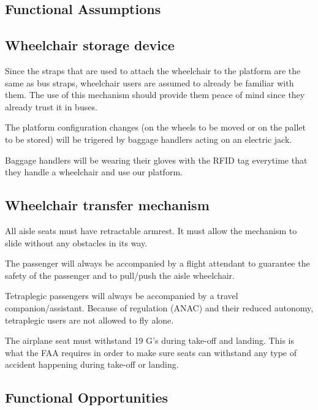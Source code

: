\subsection{Functional Assumptions}

\subsection*{Wheelchair storage device}

\begin{list}{-}{}
  \item Since the straps that are used to attach the wheelchair to the platform are the same as bus straps, wheelchair users are assumed to already be familiar with them. The use of this mechanism should provide them peace of mind since they already trust it in buses.
  \item The platform configuration changes (on the wheels to be moved or on the pallet to be stored) will be trigered by baggage handlers acting on an electric jack.
  \item Baggage handlers will be wearing their gloves with the RFID tag everytime that they handle a wheelchair and use our platform.
\end{list}

\subsection*{Wheelchair transfer mechanism}

\begin{list}{-}{}
  \item All aisle seats must have retractable armrest. It must allow the mechanism to slide without any obstacles in its way.
  \item The passenger will always be accompanied by a flight attendant to guarantee the safety of the passenger and to pull/push the aisle wheelchair.
  \item Tetraplegic passengers will always be accompanied by a travel companion/assistant. Because of regulation (ANAC) and their reduced autonomy, tetraplegic users are not allowed to fly alone.
  \item The airplane seat must withstand 19 G's during take-off and landing. This is what the FAA requires in order to make sure seats can withstand any type of accident happening during take-off or landing.
\end{list}

\subsection{Functional Opportunities}

